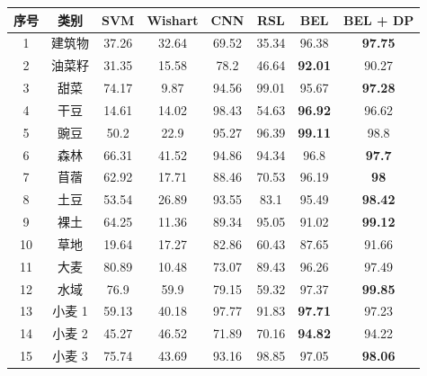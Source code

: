 \begin{table}[]
    \begin{tabular}{cccccccc}
        \toprule[1.5bp]
        序号                        & 类别    & SVM   & Wishart & CNN   & RSL   & BEL            & BEL + DP       \\
        \midrule[0.75bp]
        1                         & 建筑物   & 37.26 & 32.64   & 69.52 & 35.34 & 96.38          & \textbf{97.75} \\
        2                         & 油菜籽   & 31.35 & 15.58   & 78.2  & 46.64 & \textbf{92.01} & 90.27          \\
        3                         & 甜菜    & 74.17 & 9.87    & 94.56 & 99.01 & 95.67          & \textbf{97.28} \\
        4                         & 干豆    & 14.61 & 14.02   & 98.43 & 54.63 & \textbf{96.92} & 96.62          \\
        5                         & 豌豆    & 50.2  & 22.9    & 95.27 & 96.39 & \textbf{99.11} & 98.8           \\
        6                         & 森林    & 66.31 & 41.52   & 94.86 & 94.34 & 96.8           & \textbf{97.7}  \\
        7                         & 苜蓿    & 62.92 & 17.71   & 88.46 & 70.53 & 96.19          & \textbf{98}    \\
        8                         & 土豆    & 53.54 & 26.89   & 93.55 & 83.1  & 95.49          & \textbf{98.42} \\
        9                         & 裸土    & 64.25 & 11.36   & 89.34 & 95.05 & 91.02          & \textbf{99.12} \\
        10                        & 草地    & 19.64 & 17.27   & 82.86 & 60.43 & 87.65          & 91.66          \\
        11                        & 大麦    & 80.89 & 10.48   & 73.07 & 89.43 & 96.26          & 97.49          \\
        12                        & 水域    & 76.9  & 59.9    & 79.15 & 59.32 & 97.37          & \textbf{99.85} \\
        13                        & 小麦 1  & 59.13 & 40.18   & 97.77 & 91.83 & \textbf{97.71} & 97.23          \\
        14                        & 小麦 2  & 45.27 & 46.52   & 71.89 & 70.16 & \textbf{94.82} & 94.22          \\
        15                        & 小麦 3  & 75.74 & 43.69   & 93.16 & 98.85 & 97.05          & \textbf{98.06} \\

\end{tabular}
\end{table}
